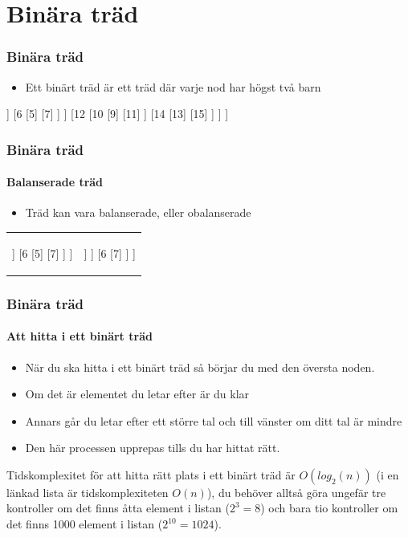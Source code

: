 \documentclass[aspectratio=169]{beamer}
\begin{document}
\section{Binära träd}

\begin{frame}
	\frametitle{Binära träd}

	\begin{itemize}
		\item Ett binärt träd är ett träd där varje nod har högst två barn
	\end{itemize}
	
	\centering
	\begin{forest}
		[8
			[4
				[2
					[1]
					[3]
				]
				[6
					[5]
					[7]
				]
			]
			[12
				[10
					[9]
					[11]
				]
				[14
					[13]
					[15]
				]
			]
		]
	\end{forest}

\end{frame}

\begin{frame}
	\frametitle{Binära träd}
	\framesubtitle{Balanserade träd}
	
	\begin{itemize}
		\item Träd kan vara balanserade, eller obalanserade
	\end{itemize}
	
	\begin{center}
		\begin{tabular}{cc}
		\begin{forest}
			[4
				[2
					[1]
					[3]
				]
				[6
					[5]
					[7]
				]
			]
		\end{forest}
		&
		\begin{forest}
			[5
				[2
					[1]
					[3
						[4]
					]
				]
				[6
					[7]
				]
			]
		\end{forest}
		\end{tabular}
	\end{center}
	
\end{frame}

\begin{frame}
	\frametitle{Binära träd}
	\framesubtitle{Att hitta i ett binärt träd}
	
	\begin{itemize}
		\item När du ska hitta i ett binärt träd så börjar du med den översta noden.
		\item Om det är elementet du letar efter är du klar
		\item Annars går du letar efter ett större tal och till vänster om ditt tal är mindre
		\item Den här processen upprepas tills du har hittat rätt.
	\end{itemize}
	
	Tidskomplexitet för att hitta rätt plats i ett binärt träd är \(O(log_2{(n)})\) (i en länkad lista är tidskomplexiteten \(O(n)\)), du behöver alltså göra ungefär tre kontroller om det finns åtta element i listan (\(2^3=8\)) och bara tio kontroller om det finns 1000 element i listan (\(2^{10}=1024\)).
	
\end{frame}
\end{document}
